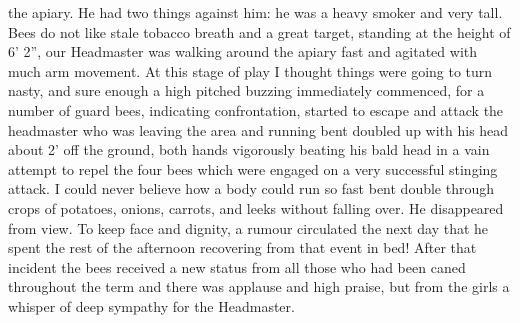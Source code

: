 the apiary. He had two things against him: he was a heavy smoker and very tall.
Bees do not like stale tobacco breath and a great target, standing at the
height of 6' 2'', our Headmaster was walking around the apiary fast and
agitated with much arm movement. At this stage of play I thought things were
going to turn nasty, and sure enough a high pitched buzzing immediately
commenced, for a number of guard bees, indicating confrontation, started to
escape and attack the headmaster who was leaving the area and running bent
doubled up with his head about 2' off the ground, both hands vigorously beating
his bald head in a vain attempt to repel the four bees which were engaged on a
very successful stinging attack. I could never believe how a body could run so
fast bent double through crops of potatoes, onions, carrots, and leeks without
falling over. He disappeared from view. To keep face and dignity, a rumour
circulated the next day that he spent the rest of the afternoon recovering from
that event in bed! After that incident the bees received a new status from all
those who had been caned throughout the term and there was applause and high
praise, but from the girls a whisper of deep sympathy for the Headmaster.

